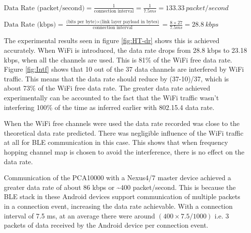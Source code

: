 $\mbox{Data Rate  (packet/second)}=\frac{1}{\mbox{connection interval}}=\frac{1}{7.5ms}=133.33\:packet/second$

\vspace{15 pt}
$\mbox{Data Rate (kbps)}=\frac{\mbox{(bits per byte)}\times\mbox{(link layer payload in bytes)}}{\mbox{connection interval}}=\frac{8\times27}{7.5ms}=28.8\:kbps$
\vspace{10 pt}

The experimental results seen in figure \ref{fig:HT-dr} shows this is achieved accurately. When WiFi is introduced, the data rate drops from 28.8 kbps to 23.18 kbps, when all the channels are used. This is 81\% of the WiFi free data rate. Figure \ref{fig:Intf} shows that 10 out of the 37 data channels are interfered by WiFi traffic. This means that the data rate should reduce by (37-10)/37, which is about 73\% of the WiFi free data rate. The greater data rate achieved experimentally can be accounted to the fact that the WiFi traffic wasn't interfering 100\% of the time as inferred earlier with 802.15.4 data rate. 

When the WiFi free channels were used the data rate recorded was close to the theoretical data rate predicted. There was negligible influence of the WiFi traffic at all for BLE communication in this case. This shows that when frequency hopping channel map is chosen to avoid the interference, there is no effect on the data rate.

Communication of the PCA10000 with a Nexus4/7 master device achieved a greater data rate of about 86 kbps or \textasciitilde400 packet/second. This is because the BLE stack in these Android devices support communication of multiple packets in a connection event, increasing the data rate achievable. With a connection interval of 7.5 ms, at an average there were around $(400\times7.5/1000)$ i.e. 3 packets of data received by the Android device per connection event.

